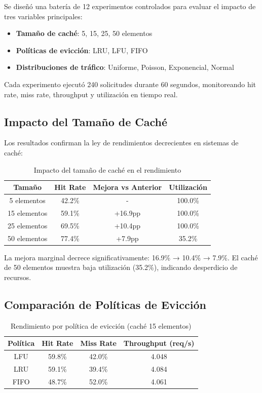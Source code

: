 \documentclass[12pt,a4paper]{article}
\begin{document}
Se diseñó una batería de 12 experimentos controlados para evaluar el impacto de tres variables principales:

\begin{itemize}
\item \textbf{Tamaño de caché}: 5, 15, 25, 50 elementos
\item \textbf{Políticas de evicción}: LRU, LFU, FIFO
\item \textbf{Distribuciones de tráfico}: Uniforme, Poisson, Exponencial, Normal
\end{itemize}

Cada experimento ejecutó 240 solicitudes durante 60 segundos, monitoreando hit rate, miss rate, throughput y utilización en tiempo real.

\subsection{Impacto del Tamaño de Caché}

Los resultados confirman la ley de rendimientos decrecientes en sistemas de caché:

\begin{table}[H]
\centering
\caption{Impacto del tamaño de caché en el rendimiento}
\begin{tabular}{|c|c|c|c|}
\hline
\textbf{Tamaño} & \textbf{Hit Rate} & \textbf{Mejora vs Anterior} & \textbf{Utilización} \\
\hline
5 elementos & 42.2\% & - & 100.0\% \\
15 elementos & 59.1\% & +16.9pp & 100.0\% \\
25 elementos & 69.5\% & +10.4pp & 100.0\% \\
50 elementos & 77.4\% & +7.9pp & 35.2\% \\
\hline
\end{tabular}
\end{table}

La mejora marginal decrece significativamente: 16.9\% → 10.4\% → 7.9\%. El caché de 50 elementos muestra baja utilización (35.2\%), indicando desperdicio de recursos.

\subsection{Comparación de Políticas de Evicción}

\begin{table}[H]
\centering
\caption{Rendimiento por política de evicción (caché 15 elementos)}
\begin{tabular}{|c|c|c|c|}
\hline
\textbf{Política} & \textbf{Hit Rate} & \textbf{Miss Rate} & \textbf{Throughput (req/s)} \\
\hline
LFU & 59.8\% & 42.0\% & 4.048 \\
LRU & 59.1\% & 39.4\% & 4.084 \\
FIFO & 48.7\% & 52.0\% & 4.061 \\
\hline
\end{tabular}
\end{table}
\end{document}
